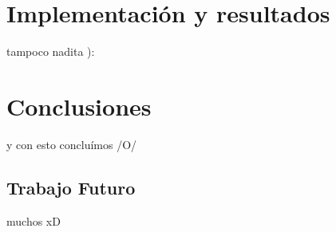 \documentclass[a4paper,openright,12pt]{report}
\begin{document}
\chapter{Implementación y resultados}\label{cap.implementacionyresultados}
tampoco nadita ):

\chapter{Conclusiones}\label{cap.conclusiones}
y con esto concluímos /O/ 
\section{Trabajo Futuro}
muchos xD


\cleardoublepage
{}


\end{document}
